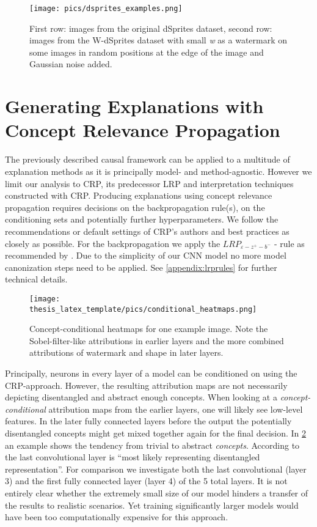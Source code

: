 \begin{figure}[H]
    \centering
    \texttt{[image: pics/dsprites\_examples.png]}
    \caption[Example Images W-dSprites]{First row: images from the original dSprites dataset, second row: images from the W-dSprites dataset with small \textit{w} as a watermark on some images in random positions at the edge of the image and Gaussian noise added.}
    \label{fig:dsprites_examples}
\end{figure}

\section{Generating Explanations with Concept Relevance Propagation}
The previously described causal framework can be applied to a multitude of explanation methods as it is principally model- and method-agnostic. However we limit our analysis to CRP, its predecessor LRP and interpretation techniques constructed with CRP.
Producing explanations using concept relevance propagation requires decisions on the backpropagation rule(s), on the conditioning sets and potentially further hyperparameters. 
We follow the recommendations or default settings of CRP's authors \cite{Achtibat2022, Achtibat2023} and best practices \cite{Kohlbrenner2020} as closely as possible.
For the backpropagation we apply the $LRP_{\varepsilon -z^+- b^-}$ - rule as recommended by \cite{Kohlbrenner2020}. Due to the simplicity of our CNN model no more model canonization steps need to be applied. See \cref{appendix:lrprules} for further technical details. 

\begin{figure}
    \centering
    \texttt{[image: thesis\_latex\_template/pics/conditional\_heatmaps.png]}
    \caption[Comparing Attribution Maps of Layers]{Concept-conditional heatmaps for one example image. Note the Sobel-filter-like attributions in earlier layers and the more combined attributions of watermark and shape in later layers.}
    \label{fig:cc_heatmaps}
\end{figure}

Principally, neurons in every layer of a model can be conditioned on using the CRP-approach. However, the resulting attribution maps are not necessarily depicting disentangled and abstract enough concepts. When looking at a \textit{concept-conditional} attribution maps from the earlier layers, one will likely see low-level features. In the later fully connected layers before the output the potentially disentangled concepts might get mixed together again for the final decision. In \cref{fig:cc_heatmaps} an example shows the tendency from trivial to abstract \textit{concepts}. 
According to \cite{Dreyer2023a, Zeiler2013} the last convolutional layer is ``most likely representing disentangled representation''. For comparison we investigate both the last convolutional (layer 3) and the first fully connected layer (layer 4) of the 5 total layers. It is not entirely clear whether the extremely small size of our model hinders a transfer of the results to realistic scenarios. Yet training significantly larger models would have been too computationally expensive for this approach. \\

